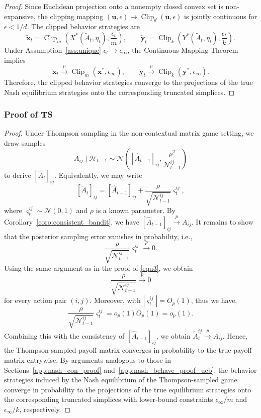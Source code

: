\documentclass[12pt]{article}
\begin{document}
\begin{proof}
Since Euclidean projection onto a nonempty closed convex set is non-expansive,
the clipping mapping $(\bm u,\epsilon) \mapsto \operatorname{Clip}_d(\bm u,\epsilon)$
is jointly continuous for $\epsilon<1/d$. The clipped behavior strategies are 
\[
\widetilde{\bm x}_t =
\operatorname{Clip}_m
\left(
X^\ast(\widetilde A_t,\eta_t),
\frac{\epsilon_t}{m}
\right),
\qquad
\widetilde{\bm y}_t =
\operatorname{Clip}_k
\left(
Y^\ast(\widetilde A_t,\eta_t),
\frac{\epsilon_t}{k}
\right).
\]
Under Assumption~\ref{ass:unique} $\epsilon_t\to\epsilon_\infty$, the Continuous Mapping Theorem implies
\[
\widetilde{\bm x}_t
\stackrel{p}{\to}
\operatorname{Clip}_m
\left(
\bm x^\ast,
\epsilon_\infty
\right),
\qquad
\widetilde{\bm y}_t
\stackrel{p}{\to}
\operatorname{Clip}_k
\left(
\bm y^\ast,
\epsilon_\infty
\right).
\]
Therefore, the clipped behavior strategies converge to the projections of the
true Nash equilibrium strategies onto the corresponding truncated simplices.
\end{proof}


\subsubsection{Proof of TS}
\label{app:nash_behave_proof_ts}
\begin{proof}
Under Thompson sampling in the non-contextual matrix game setting, we draw samples
\[
\widetilde A_{ij}
\mid \mathcal H_{t-1}
\sim
\mathcal N\left(
[\widehat A_{t-1}]_{ij},
\frac{\rho^2}{\mathcal N_{t-1}^{ij}}
\right)
\]
to derive $[\widetilde A_{t}]_{ij}$. Equivalently, we may write
\[
[\widetilde A_{t}]_{ij} =
[\widehat A_{t-1}]_{ij} + \frac{\rho}{\sqrt{\mathcal N_{t-1}^{ij}}}\varsigma_t^{ij},
\]
where $\varsigma_t^{ij}\sim \mathcal N(0,1)$ and $\rho$ is a known parameter. By Corollary~\ref{coro:consistent_bandit}, we have $[\widehat A_{t-1}]_{ij} \stackrel{p}{\to} A_{ij}$. It remains to show that the posterior
sampling error vanishes in probability, i.e.,
\[
\frac{\rho}{\sqrt{\mathcal N_{t-1}^{ij}}}\varsigma_t^{ij}
\stackrel{p}{\to}
0.
\]
Using the same argument as in the proof of \eqref{equ3}, we obtain
\[
\frac{\rho}{\sqrt{\mathcal N_{t-1}^{ij}}}
\stackrel{p}{\to} 0
\]
for every action pair $(i,j)$. Moreover, with $|\varsigma_t^{ij}|=O_p(1)$,
thus we have,
\[
\frac{\rho}{\sqrt{\mathcal N_{t-1}^{ij}}}\varsigma_t^{ij}
= o_p(1)O_p(1) = o_p(1).
\]
Combining this with the consistency of $[\widehat A_{t-1}]_{ij}$, we obtain $\widetilde A_t^{ij} \stackrel{p}{\to} A_{ij}$.
Hence, the Thompson-sampled payoff matrix converges in probability to the true
payoff matrix entrywise. 
By arguments analogous to those in Sections~\ref{app:nash_con_proof} and~\ref{app:nash_behave_proof_ucb}, the behavior strategies induced by the Nash equilibrium of the Thompson-sampled game converge in probability to the projections of the true equilibrium strategies onto the corresponding truncated simplices with lower-bound constraints $\epsilon_\infty/m$ and $\epsilon_\infty/k$, respectively.
\end{proof}
\end{document}
